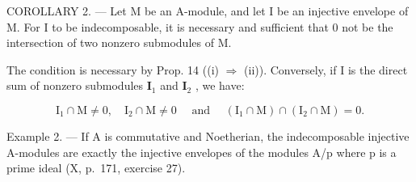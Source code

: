 COROLLARY 2. --- Let M be an A-module, and let I be an injective envelope of M. For I to be indecomposable, it is necessary and sufficient that 0 not be the intersection of two nonzero submodules of M.

The condition is necessary by Prop. 14 ((i) \(\Rightarrow\) (ii)). Conversely, if I is the direct sum of nonzero submodules \(\mathbf{I}_1\) and \(\mathbf{I}_2\) , we have:

\[
\mathrm{I} _ {1} \cap \mathrm{M} \neq 0, \quad \mathrm{I} _ {2} \cap \mathrm{M} \neq 0 \quad \text { and } \quad (\mathrm{I} _ {1} \cap \mathrm{M}) \cap (\mathrm{I} _ {2} \cap \mathrm{M}) = 0.
\]

Example 2. --- If A is commutative and Noetherian, the indecomposable injective A-modules are exactly the injective envelopes of the modules A/p where p is a prime ideal (X, p.~171, exercise 27).

